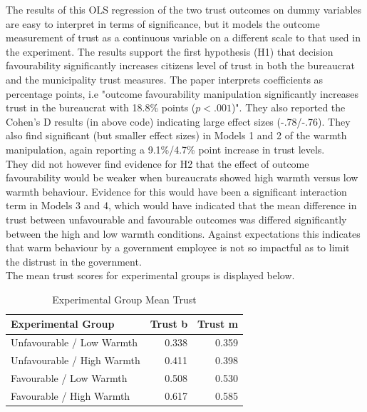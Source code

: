 \documentclass[12pt,letterpaper]{article}
\begin{document}
	 	\FloatBarrier
	The results of this OLS regression of the two trust outcomes on dummy variables are easy to interpret in terms of significance, but it models the outcome measurement of trust as a continuous variable on a different scale to that used in the experiment.  The results support the first hypothesis (H1) that decision favourability significantly increases citizens level of trust in both the bureaucrat and the municipality trust measures. The paper interprets coefficients as percentage points, i.e "outcome favourability manipulation significantly increases trust in the bureaucrat with 18.8\% points ($p <.001$)". They also reported the Cohen's D results (in above code) indicating large effect sizes (-.78/-.76). They also find significant (but smaller effect sizes) in Models 1 and 2 of the warmth manipulation, again reporting a 9.1\%/4.7\% point increase in trust levels. \\
	
	They did not however find evidence for H2 that the effect of outcome favourability would be weaker when bureaucrats showed high warmth versus low warmth behaviour. Evidence for this would have been a significant interaction term in Models 3 and 4,  which would have indicated that the mean difference in trust between unfavourable and favourable outcomes was differed significantly between the high and low warmth conditions.  Against expectations this indicates that warm behaviour by a government employee is not so impactful as to limit the distrust in the government. \\
	
	The mean trust scores for experimental groups is displayed below.  
	
	
	\begin{table}
	\caption{Experimental Group Mean Trust}
	\centering
	\begin{tabular}{lrr}
		\toprule
		Experimental Group & Trust b & Trust m\\
		\midrule
		Unfavourable / Low Warmth & 0.338 & 0.359\\
		Unfavourable / High Warmth & 0.411 & 0.398\\
		Favourable / Low Warmth & 0.508 & 0.530\\
		Favourable / High Warmth & 0.617 & 0.585\\
		\bottomrule
	\end{tabular}
	\end{table}
	\FloatBarrier
	
\end{document}
